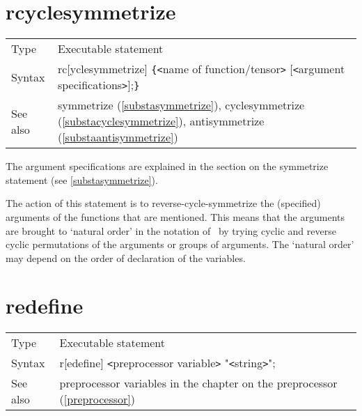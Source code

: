  
\section{rcyclesymmetrize}
\label{substarcyclesymmetrize}

\noindent \begin{tabular}{ll}
Type & Executable statement\\
Syntax & rc[yclesymmetrize] \verb:{:{\tt<}name of function/tensor{\tt>}
         [{\tt<}argument specifications{\tt>}];\verb:}: \\
See also & symmetrize (\ref{substasymmetrize}), cyclesymmetrize 
(\ref{substacyclesymmetrize}), antisymmetrize (\ref{substaantisymmetrize})
\end{tabular} \vspace{4mm}

\noindent The argument specifications are explained 
in the section on the symmetrize statement (see 
\ref{substasymmetrize}). \medskip

\noindent The action of this statement is to
reverse-cycle-symmetrize
 the (specified) arguments of the functions 
that are mentioned. This means that the arguments are brought to `natural 
order' in the notation of \FORM\ by trying cyclic and reverse cyclic 
permutations of the arguments or groups of arguments. 
The `natural order' may depend on the order of declaration of the 
variables. \vspace{10mm}


\section{redefine}
\label{substaredefine}

\noindent \begin{tabular}{ll}
Type & Executable statement\\
Syntax & r[edefine] {\tt<}preprocessor variable{\tt>} "{\tt<}string{\tt>}";
\\ See also & preprocessor variables in the chapter on the preprocessor 
    (\ref{preprocessor})
\end{tabular} \vspace{4mm}

